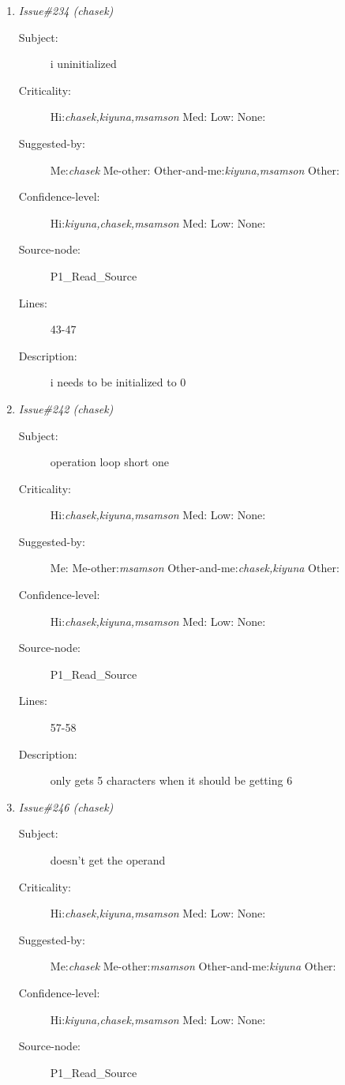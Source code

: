 \begin{enumerate}
\begin{description}
\item [Lines:] 29-37

\item [Description:] Will always print out the listing of errors
even tho it should only do so if errorsfound is true.
\end{description}
\item {\it Issue\#234 (chasek)}
\begin{description}
\item [Subject:] i uninitialized
\item [Criticality:] Hi:{\it chasek,kiyuna,msamson} Med:{\it } Low:{\it } None:{\it }
\item [Suggested-by:] Me:{\it chasek} Me-other:{\it } Other-and-me:{\it kiyuna,msamson} Other:{\it }
\item [Confidence-level:] Hi:{\it kiyuna,chasek,msamson} Med:{\it } Low:{\it } None:{\it }
\item [Source-node:] P1\_Read\_Source

\item [Lines:] 43-47

\item [Description:] i needs to be initialized to 0
\end{description}
\item {\it Issue\#242 (chasek)}
\begin{description}
\item [Subject:] operation loop short one
\item [Criticality:] Hi:{\it chasek,kiyuna,msamson} Med:{\it } Low:{\it } None:{\it }
\item [Suggested-by:] Me:{\it } Me-other:{\it msamson} Other-and-me:{\it chasek,kiyuna} Other:{\it }
\item [Confidence-level:] Hi:{\it chasek,kiyuna,msamson} Med:{\it } Low:{\it } None:{\it }
\item [Source-node:] P1\_Read\_Source

\item [Lines:] 57-58

\item [Description:] only gets 5 characters when it should be
getting 6
\end{description}
\item {\it Issue\#246 (chasek)}
\begin{description}
\item [Subject:] doesn't get the operand
\item [Criticality:] Hi:{\it chasek,kiyuna,msamson} Med:{\it } Low:{\it } None:{\it }
\item [Suggested-by:] Me:{\it chasek} Me-other:{\it msamson} Other-and-me:{\it kiyuna} Other:{\it }
\item [Confidence-level:] Hi:{\it kiyuna,chasek,msamson} Med:{\it } Low:{\it } None:{\it }
\item [Source-node:] P1\_Read\_Source


\end{description}
\end{enumerate}
